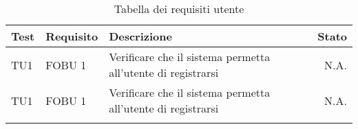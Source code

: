 \begin{longtable}{llXr}%
\toprule
\textbf{Test} & \textbf{Requisito} & \textbf{Descrizione} & \textbf{Stato}\\
\toprule
TU1&FOBU 1&Verificare che il sistema permetta all'utente di registrarsi&N.A.\\
\midrule
TU1&FOBU 1&Verificare che il sistema permetta all'utente di registrarsi&N.A.\\
\bottomrule
\caption{Tabella dei requisiti utente}
\end{longtable}
